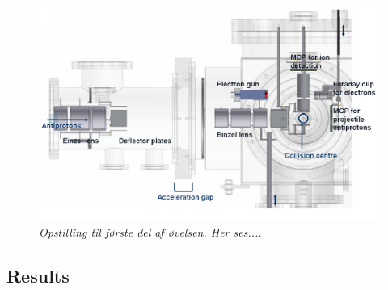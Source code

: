 \documentclass[danish,a4paper,twocolumn,amsmath,amssymb,floatfix]{revtex4-1}
\begin{document}
\begin{figure}
\centering
\includegraphics[width=\columnwidth]{figure1.png}
\caption{\sl Opstilling til første del af øvelsen. Her ses....}
\label{fig:en_label} %
\end{figure} 

\subsection*{Results}
\end{document}
